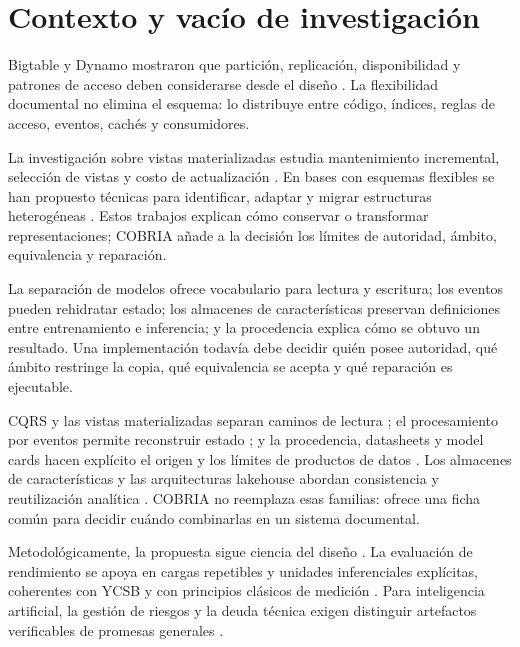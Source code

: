 \documentclass[12pt]{article}
\begin{document}
\section{Contexto y vacío de investigación}

Bigtable y Dynamo mostraron que partición, replicación, disponibilidad y patrones de
acceso deben considerarse desde el diseño \parencite{chang2006bigtable,
decandia2007dynamo}. La flexibilidad documental no elimina el esquema: lo distribuye
entre código, índices, reglas de acceso, eventos, cachés y consumidores.

La investigación sobre vistas materializadas estudia mantenimiento incremental,
selección de vistas y costo de actualización \parencite{gupta1993incremental,
gupta1995materialized}. En bases con esquemas flexibles se han propuesto técnicas para
identificar, adaptar y migrar estructuras heterogéneas
\parencite{aulbach2009flexibleschemas,ni2014adaptiveschema,
rico2016multitarget,scherzinger2013schema}. Estos trabajos explican cómo conservar o
transformar representaciones; COBRIA añade a la decisión los límites de autoridad,
ámbito, equivalencia y reparación.

La separación de modelos ofrece vocabulario para lectura y escritura; los eventos pueden
rehidratar estado; los almacenes de características preservan definiciones entre
entrenamiento e inferencia; y la procedencia explica cómo se obtuvo un resultado. Una
implementación todavía debe decidir quién posee autoridad, qué ámbito restringe la
copia, qué equivalencia se acepta y qué reparación es ejecutable.

CQRS y las vistas materializadas separan caminos de lectura
\parencite{microsoft2025cqrs,microsoft2025materialized}; el procesamiento por eventos
permite reconstruir estado \parencite{fowler2005eventsourcing}; y la procedencia,
datasheets y model cards hacen explícito el origen y los límites de productos de datos
\parencite{buneman2001provenance,gebru2021datasheets,mitchell2019modelcards}. Los
almacenes de características y las arquitecturas lakehouse abordan consistencia y
reutilización analítica \parencite{orr2021featurestores,li2023featurestore,
armbrust2021lakehouse}. COBRIA no reemplaza esas familias: ofrece una ficha común para
decidir cuándo combinarlas en un sistema documental.

Metodológicamente, la propuesta sigue ciencia del diseño
\parencite{hevner2004designscience,peffers2007dsrm}. La evaluación de rendimiento se
apoya en cargas repetibles y unidades inferenciales explícitas, coherentes con YCSB y
con principios clásicos de medición \parencite{cooper2010ycsb,jain1991performance}.
Para inteligencia artificial, la gestión de riesgos y la deuda técnica exigen distinguir
artefactos verificables de promesas generales \parencite{sculley2015debt,
nist2023airmf,nist2024genai}.
\end{document}
